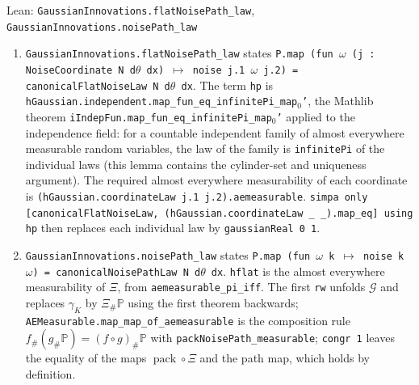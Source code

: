 \documentclass[11pt,a4paper]{article}
\begin{document}
\begin{leanbox}{Lean: \texttt{GaussianInnovations.\allowbreak{}flatNoisePath\_\allowbreak{}law}, \texttt{GaussianInnovations.\allowbreak{}noisePath\_\allowbreak{}law}}
\begin{enumerate}
\item \texttt{Gaussian\allowbreak{}Innovations.\allowbreak{}flat\allowbreak{}Noise\allowbreak{}Path\_\allowbreak{}law} states \texttt{P.\allowbreak{}map (fun \ensuremath{\omega} (j : Noise\allowbreak{}Coordinate N d\ensuremath{\theta} dx) \ensuremath{\mapsto} noise j.\allowbreak{}1 \ensuremath{\omega} j.\allowbreak{}2) = canonical\allowbreak{}Flat\allowbreak{}Noise\allowbreak{}Law N d\ensuremath{\theta} dx}. The term \texttt{hp} is \texttt{h\allowbreak{}Gaussian.\allowbreak{}independent.\allowbreak{}map\_\allowbreak{}fun\_\allowbreak{}eq\_\allowbreak{}infinite\allowbreak{}Pi\_\allowbreak{}map\ensuremath{{}_{0}}'}, the Mathlib theorem \texttt{i\allowbreak{}Indep\allowbreak{}Fun.\allowbreak{}map\_\allowbreak{}fun\_\allowbreak{}eq\_\allowbreak{}infinite\allowbreak{}Pi\_\allowbreak{}map\ensuremath{{}_{0}}'} applied to the independence field: for a countable independent family of almost everywhere measurable random variables, the law of the family is \texttt{infinite\allowbreak{}Pi} of the individual laws (this lemma contains the cylinder-set and uniqueness argument). The required almost everywhere measurability of each coordinate is \texttt{(h\allowbreak{}Gaussian.\allowbreak{}coordinate\allowbreak{}Law j.\allowbreak{}1 j.\allowbreak{}2).\allowbreak{}aemeasurable}. \texttt{simpa only [canonical\allowbreak{}Flat\allowbreak{}Noise\allowbreak{}Law, (h\allowbreak{}Gaussian.\allowbreak{}coordinate\allowbreak{}Law \_\allowbreak{} \_\allowbreak{}).\allowbreak{}map\_\allowbreak{}eq] using hp} then replaces each individual law by \texttt{gaussian\allowbreak{}Real 0 1}.

\item \texttt{Gaussian\allowbreak{}Innovations.\allowbreak{}noise\allowbreak{}Path\_\allowbreak{}law} states \texttt{P.\allowbreak{}map (fun \ensuremath{\omega} k \ensuremath{\mapsto} noise k \ensuremath{\omega}) = canonical\allowbreak{}Noise\allowbreak{}Path\allowbreak{}Law N d\ensuremath{\theta} dx}. \texttt{hflat} is the almost everywhere measurability of \(\Xi\), from \texttt{aemeasurable\_\allowbreak{}pi\_\allowbreak{}iff}. The first \texttt{rw} unfolds \(\mathcal G\) and replaces \(\gamma_K\) by \(\Xi_\#\mathbb P\) using the first theorem backwards; \texttt{AEMeasurable.\allowbreak{}map\_\allowbreak{}map\_\allowbreak{}of\_\allowbreak{}aemeasurable} is the composition rule \(f_\#(g_\#\mathbb P)=(f\circ g)_\#\mathbb P\) with \texttt{pack\allowbreak{}Noise\allowbreak{}Path\_\allowbreak{}measurable}; \texttt{congr 1} leaves the equality of the maps \(\operatorname{pack}\circ\Xi\) and the path map, which holds by definition.

\end{enumerate}
\end{leanbox}
\end{document}
